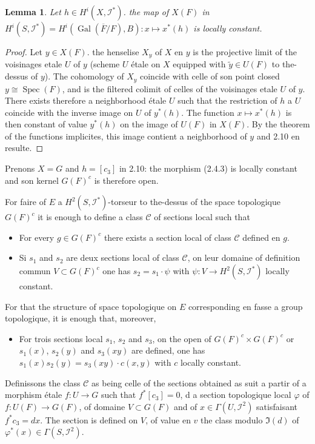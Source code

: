 \documentclass[11pt,a4paper]{article}
\theoremstyle{plain}
\newtheorem{lemma}[theorem]{Lemma}
\theoremstyle{definition}
\DeclareMathOperator{\Gal}{Gal}
\DeclareMathOperator{\Spec}{Spec}
\begin{document}
\begin{lemma}\label{2.10}
Let $h \in H^i(X, \mathscr{I}^*)$. the map of $X(F)$ in $H^i(S, \mathscr{I}^*) = H^i(\Gal(\overline{F}/F), B) : x \mapsto x^*(h)$ is locally constant.
\end{lemma}

\begin{proof}
Let $y \in X(F)$. the henselise $X_y$ of $X$ en $y$ is the projective limit of the voisinages etale $U$ of $y$ (scheme $U$ étale on $X$ equipped with $\tilde{y} \in U(F)$ to the-dessus of $y$). The cohomology of $X_y$ coincide with celle of son point closed $y \cong \Spec(F)$, and is the filtered colimit of celles of the voisinages etale $U$ of $y$. There exists therefore a neighborhood étale $U$ such that the restriction of $h$ a $U$ coincide with the inverse image on $U$ of $y^*(h)$. The function $x \mapsto x^*(h)$ is then constant of value $y^*(h)$ on the image of $U(F)$ in $X(F)$. By the theorem of the functions implicites, this image contient a neighborhood of $y$ and 2.10 en resulte.
\end{proof}

Prenons $X = G$ and $h = [c_3]$ in 2.10: the morphism (2.4.3) is locally constant and son kernel $G(F)^c$ is therefore open.

For faire of $E$ a $H^2(S, \mathscr{I}^*)$-torseur to the-dessus of the space topologique $G(F)^c$ it is enough to define a class $\mathscr{C}$ of sections local such that
\begin{itemize}
\item[a)] For every $g \in G(F)^c$ there exists a section local of class $\mathscr{C}$ defined en $g$.
\item[b)] Si $s_1$ and $s_2$ are deux sections local of class $\mathscr{C}$, on leur domaine of definition commun $V \subset G(F)^c$ one has $s_2 = s_1 \cdot \psi$ with $\psi : V \to H^2(S, \mathscr{I}^*)$ locally constant.
\end{itemize}
For that the structure of space topologique on $E$ corresponding en fasse a group topologique, it is enough that, moreover,
\begin{itemize}
\item[c)] For trois sections local $s_1$, $s_2$ and $s_3$, on the open of $G(F)^c \times G(F)^c$ or $s_1(x)$, $s_2(y)$ and $s_3(xy)$ are defined, one has $s_1(x) s_2(y) = s_3(xy) \cdot c(x,y)$ with $c$ locally constant.
\end{itemize}

Definissons the class $\mathscr{C}$ as being celle of the sections obtained as suit a partir of a morphism étale $f : U \to G$ such that $f^*[c_3] = 0$, d a section topologique local $\varphi$ of $f : U(F) \to G(F)$, of domaine $V \subset G(F)$ and of $x \in \Gamma(U, \mathscr{I}^2)$ satisfaisant $f^* c_3 = dx$. The section is defined on $V$, of value en $v$ the class modulo $\Im(d)$ of $\varphi^*(x) \in \Gamma(S, \mathscr{I}^2)$.
\end{document}
